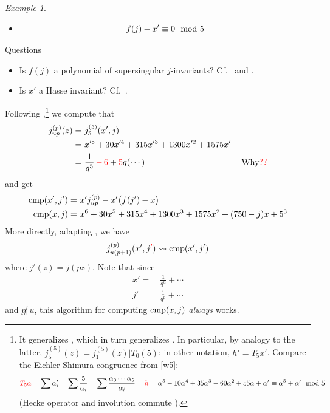 \documentclass{rs}
\theoremstyle{definition}
\theoremstyle{remark}
\newtheorem{ex}[equation]{Example}
\newcommand{\cmp}{{\rm cmp}}
\newcommand{\md}{~~{\rm mod}~}
\newcommand{\A}{\alpha}
\renewcommand{\=}{\approx}
\renewcommand{\-}{\sim}
\newcommand{\rd}[1]{{\textcolor{red}{#1}}}
\numberwithin{equation}{section}
\begin{document}
\begin{ex}
\begin{itemize}
  \item
  \begin{equation}
   \label{hasse5}
   f(j) - x' \equiv 0 \md 5 
  \end{equation}
 \end{itemize}
 Questions 
 \begin{itemize}
  \item Is $f(j)$ a polynomial of supersingular $j$-invariants?  
  Cf.~\cite[Theorem 1]{KanekoZagier} and \cite[Theorems 1.1 and 1.5]{MilasMortensonOno}.  

  \item Is $x'$ a Hasse invariant?  
  Cf.~\cite[Remark 3.4]{p3}.  
 \end{itemize}

 Following \cite[(2.4)]{Choi},\footnote{It generalizes \cite[p788]{Ahlgren}, which in turn generalizes \cite[pp553-554]{BKO}.  
 In particular, by analogy to the latter, $j_5^{(5)}(z) = j_1^{(5)}(z) | T_0(5)$; in other notation, $h' = T_5 x'$.  
 Compare the Eichler-Shimura congruence from \eqref{w5}: 
 \[
  \rd{T_5 \A} = \sum \A_i' = \sum \frac{5}{\A_i} = \sum \frac{\A_0 \cdots \A_5}{\A_i} = \rd{h} = \A^5 - 10 \A^4 + 35 \A^3 - 60 \A^2 + 55 \A + \A' \equiv \A^5 + \A' \md 5 
 \]
 (Hecke operator and involution commute \cite[Lemma 11]{AtkinLehner}).}
 we compute that 
 \[
  \begin{split}
   j_{u p}^{(p)}(z) = & ~ j_5^{(5)}(x',j) \\
                    = & ~ x'^5 + 30 x'^4 + 315 x'^3 + 1300 x'^2 + 1575 x' \\
                    = & ~ \frac{1}{q^5} \, \rd{- \, 6} + \rd{5} q (\cdots) \hskip 4cm \text{Why\rd{??}} 
  \end{split}
 \]
 and get 
 \[
  \begin{split}
   \cmp(x',j') = & ~ x' j_{u p}^{(p)} - x' \big(f(j') - x\big) \\
     \cmp(x,j) = & ~ x^6 + 30 x^5 + 315 x^4 + 1300 x^3 + 1575 x^2 + (750 - j) x + 5^3 
  \end{split}
 \]
 More directly, adapting \cite[(2.4)]{Choi}, we have 
 \[
  j_{u (p + 1)}^{(p)}(x',j\rd{'}) \leadsto \cmp(x',j') 
 \]
 where $j'(z) = j(p z)$.  Note that since 
 \[
  \begin{split}
   x' = & ~ \frac{1}{q^u} + \cdots \\
   j' = & ~ \frac{1}{q^p} + \cdots 
  \end{split}
 \]
 and $p \!\!\not|\, u$, this algorithm for computing $\cmp(x,j)$ {\em always} works.  


\end{ex}
\end{document}
